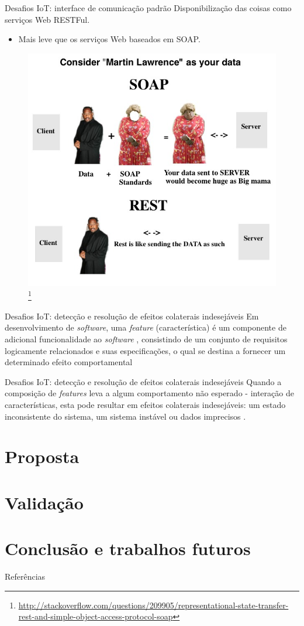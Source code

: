 \documentclass[brazil]{beamer}
\begin{document}
\begin{frame}{Desafios IoT: interface de comunicação padrão}
Disponibilização das coisas como serviços Web RESTFul.
  \begin{itemize}
    \item Mais leve que os serviços Web baseados em SOAP.
  \end{itemize}
\begin{figure}[!htb] \centering 
  \centering
  \includegraphics[width=.45\columnwidth]{slide/soapXrest_engracado} 
  \caption{\footnote[frame]{\url{http://stackoverflow.com/questions/209905/representational-state-transfer-rest-and-simple-object-access-protocol-soap}}}
  \label{fig:soapXrest_engracado}
\end{figure}
\end{frame}

\begin{frame}{Desafios IoT: detecção e resolução de efeitos colaterais indesejáveis}
Em desenvolvimento de \textit{software}, uma \alert{\textit{feature} (característica)} é um componente de adicional funcionalidade ao \textit{software} \cite{Calder:2003}, consistindo de um conjunto de requisitos logicamente relacionados e suas especificações, o qual se destina a fornecer um determinado efeito comportamental \cite{NHLABATSI:2008}
\end{frame}

\begin{frame}{Desafios IoT: detecção e resolução de efeitos colaterais indesejáveis}
Quando a \alert{composição de \textit{features}} leva a algum \alert{comportamento não esperado} - interação de características, esta pode resultar em \alert{efeitos colaterais indesejáveis}: um estado inconsistente do sistema, um sistema instável ou dados imprecisos \cite{NHLABATSI:2008}.
\end{frame}

\section{Proposta}


\section{Validação}

\section{Conclusão e trabalhos futuros}


\begin{frame}[allowframebreaks]{Referências}
  
\end{frame}
\end{document}
